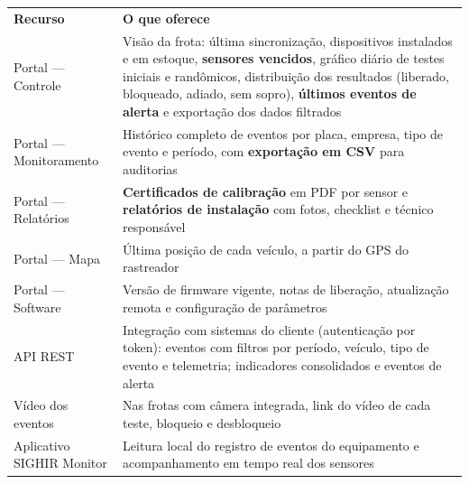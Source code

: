\documentclass[a4paper,10pt]{article}
\renewcommand{\arraystretch}{1.25}
\newcommand{\thead}[1]{\textbf{\color{white}#1}}
\newcommand{\headrow}{\rowcolor{sdark}}
\begin{document}
\vspace{4mm}
\small
\renewcommand{\arraystretch}{1.3}
\begin{tabularx}{\linewidth}{@{}B{40mm}L@{}}
\headrow \thead{Recurso} & \thead{O que oferece}\\
Portal — Controle & Visão da frota: última sincronização, dispositivos instalados e em estoque, \textbf{sensores vencidos}, gráfico diário de testes iniciais e randômicos, distribuição dos resultados (liberado, bloqueado, adiado, sem sopro), \textbf{últimos eventos de alerta} e exportação dos dados filtrados\\
 Portal — Monitoramento & Histórico completo de eventos por placa, empresa, tipo de evento e período, com \textbf{exportação em CSV} para auditorias\\
Portal — Relatórios & \textbf{Certificados de calibração} em PDF por sensor e \textbf{relatórios de instalação} com fotos, checklist e técnico responsável\\
 Portal — Mapa & Última posição de cada veículo, a partir do GPS do rastreador\\
Portal — Software & Versão de firmware vigente, notas de liberação, atualização remota e configuração de parâmetros\\
 API REST & Integração com sistemas do cliente (autenticação por token): eventos com filtros por período, veículo, tipo de evento e telemetria; indicadores consolidados e eventos de alerta\\
Vídeo dos eventos & Nas frotas com câmera integrada, link do vídeo de cada teste, bloqueio e desbloqueio\\
 Aplicativo SIGHIR Monitor & Leitura local do registro de eventos do equipamento e acompanhamento em tempo real dos sensores\\
\end{tabularx}
\normalsize
\renewcommand{\arraystretch}{1.25}
\end{document}
